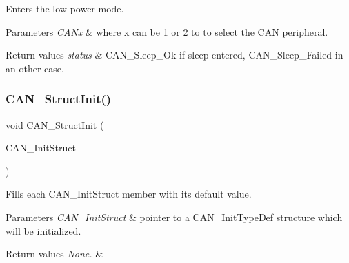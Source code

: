 Enters the low power mode. 


\begin{DoxyParams}{Parameters}
{\em C\+A\+Nx} & where x can be 1 or 2 to to select the C\+AN peripheral. \\
\hline
\end{DoxyParams}

\begin{DoxyRetVals}{Return values}
{\em status} & C\+A\+N\+\_\+\+Sleep\+\_\+\+Ok if sleep entered, C\+A\+N\+\_\+\+Sleep\+\_\+\+Failed in an other case. \\
\hline
\end{DoxyRetVals}
\mbox{\label{group___c_a_n___exported___functions_gad77ad810868ed111755fc9e8ae0c7646}} 
\subsubsection{\texorpdfstring{CAN\_StructInit()}{CAN\_StructInit()}}
{\footnotesize\ttfamily void C\+A\+N\+\_\+\+Struct\+Init (\begin{DoxyParamCaption}\item[{\mbox{\hyperlink{struct_c_a_n___init_type_def}{C\+A\+N\+\_\+\+Init\+Type\+Def}} $\ast$}]{C\+A\+N\+\_\+\+Init\+Struct }\end{DoxyParamCaption})}



Fills each C\+A\+N\+\_\+\+Init\+Struct member with its default value. 


\begin{DoxyParams}{Parameters}
{\em C\+A\+N\+\_\+\+Init\+Struct} & pointer to a \mbox{\hyperlink{struct_c_a_n___init_type_def}{C\+A\+N\+\_\+\+Init\+Type\+Def}} structure which will be initialized. \\
\hline
\end{DoxyParams}

\begin{DoxyRetVals}{Return values}
{\em None.} & \\
\hline
\end{DoxyRetVals}
\mbox{\label{group___c_a_n___exported___functions_gaccfcb81f76f58400077c7b2d8641dd83}} 
